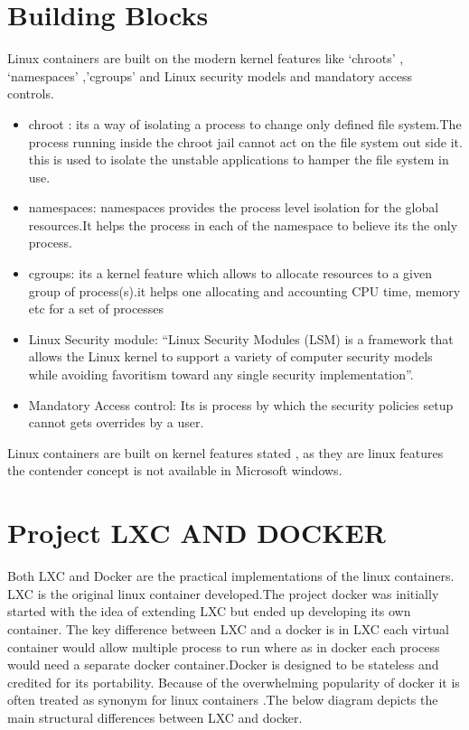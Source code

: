 \documentclass[9pt,twocolumn,twoside]{styles/osajnl}
\begin{document}
\section{Building Blocks}

 Linux containers are built on the modern kernel features like
‘chroots’ , ‘namespaces’ ,’cgroups’ and Linux security models and
mandatory access controls.\cite{www-bondner}
\begin{itemize}
\item chroot :
its a way of isolating a process to change only defined file
system.The process running inside the chroot jail cannot act on the
file system out side it. this is used to isolate the unstable
applications to hamper the file system in use.\cite{www-ubuntu}
\item namespaces:
namespaces provides the process level isolation for the global
resources.It helps the process in each of the namespace to believe its
the only process.\cite{www-bondner}
\item cgroups: 
its a kernel feature which allows to
allocate resources to a given group of process(s).it helps one
allocating and accounting CPU time, memory etc for a set of
processes\cite{www-infoworld}
\item  Linux Security module:
 “Linux Security Modules (LSM) is a
framework that allows the Linux kernel to support a variety of
computer security models while avoiding favoritism toward any single
security implementation”.\cite{www-wiki-LSM}
\item Mandatory Access control: 
Its is process
by which the security policies setup cannot gets overrides by a
user. \cite{www-linux}
\end{itemize} 
Linux containers are built on kernel features stated , as they are linux
features the contender concept is not available in Microsoft windows. 

\section{Project LXC AND DOCKER}
Both LXC and Docker are the practical implementations of the linux
containers.  LXC is the original linux container developed.The project
docker was initially started with the idea of extending LXC but ended
up developing its own container. The key difference between LXC and a
docker is in LXC each virtual container would allow multiple process
to run where as in docker each process would need a separate docker
container.Docker is designed to be stateless and credited for its
portability. Because of the overwhelming popularity of docker it is
often treated as synonym for linux containers .The below diagram
depicts the main structural differences between LXC and docker.\cite{www-lxc-docker}
\end{document}
